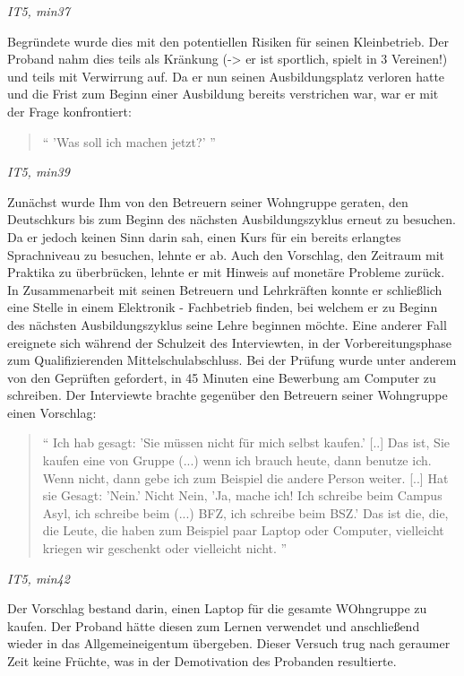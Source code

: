 \centerline{\textit{IT5, min37}}
Begründete wurde dies mit den potentiellen Risiken für seinen Kleinbetrieb. Der Proband nahm dies teils als Kränkung (-> er ist sportlich, spielt in 3 Vereinen!) und teils mit Verwirrung auf.\newline
Da er nun seinen Ausbildungsplatz verloren hatte und die Frist zum Beginn einer Ausbildung bereits verstrichen war, war er mit der Frage konfrontiert:
\begin{quote}
    `` 'Was soll ich machen jetzt?' ''
\end{quote}
\centerline{\textit{IT5, min39}}
Zunächst wurde Ihm von den Betreuern seiner Wohngruppe geraten, den Deutschkurs bis zum Beginn des nächsten Ausbildungszyklus erneut zu besuchen. Da er jedoch keinen Sinn darin sah, einen Kurs für ein bereits erlangtes Sprachniveau zu besuchen, lehnte er ab. Auch den Vorschlag, den Zeitraum mit Praktika zu überbrücken, lehnte er mit Hinweis auf monetäre Probleme zurück.\newline
In Zusammenarbeit mit seinen Betreuern und Lehrkräften konnte er schließlich eine Stelle in einem Elektronik - Fachbetrieb finden, bei welchem er zu Beginn des nächsten Ausbildungszyklus seine Lehre beginnen möchte.\newline
Eine anderer Fall ereignete sich während der Schulzeit des Interviewten, in der Vorbereitungsphase zum Qualifizierenden Mittelschulabschluss. Bei der Prüfung wurde unter anderem von den Geprüften gefordert, in 45 Minuten eine Bewerbung am Computer zu schreiben.
Der Interviewte brachte gegenüber den Betreuern seiner Wohngruppe einen Vorschlag:
\begin{quote}
    `` Ich hab gesagt: 'Sie müssen nicht für mich selbst kaufen.' [..] Das ist, Sie kaufen eine von Gruppe (...) wenn ich brauch heute, dann benutze ich. Wenn nicht, dann gebe ich zum Beispiel die andere Person weiter. [..] Hat sie Gesagt: 'Nein.' Nicht Nein, 'Ja, mache ich! Ich schreibe beim Campus Asyl, ich schreibe beim (...) BFZ, ich schreibe beim BSZ.' Das ist die, die, die Leute, die haben zum Beispiel paar Laptop oder Computer, vielleicht kriegen wir geschenkt oder vielleicht nicht. ''
\end{quote}
\centerline{\textit{IT5, min42}}
Der Vorschlag bestand darin, einen Laptop für die gesamte WOhngruppe zu kaufen. Der Proband hätte diesen zum Lernen verwendet und anschließend wieder in das Allgemeineigentum übergeben. Dieser Versuch trug nach geraumer Zeit keine Früchte, was in der Demotivation des Probanden resultierte.
